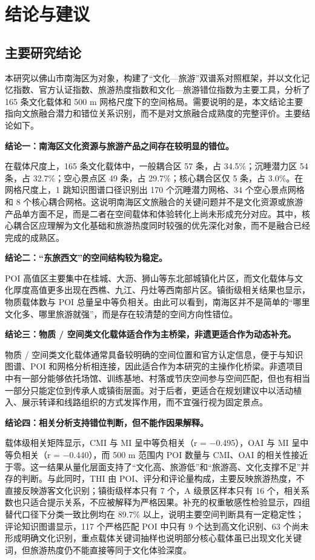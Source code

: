 \chapter{结论与建议}\label{ux7ed3ux8bbaux4e0eux5efaux8bae}

\section{主要研究结论}\label{ux4e3bux8981ux7814ux7a76ux7ed3ux8bba}

本研究以佛山市南海区为对象，构建了``文化---旅游''双谱系对照框架，并以文化记忆指数、官方认证指数、旅游热度指数和文化---旅游错位指数为主要工具，分析了 165 条文化载体和 500 m 网格尺度下的空间格局。需要说明的是，本文结论主要指向文旅融合潜力和错位关系识别，而不是对文旅融合成熟度的完整评价。主要结论如下。

\textbf{结论一：南海区文化资源与旅游产品之间存在较明显的错位。}

在载体尺度上，165 条文化载体中，一般耦合区 57 条，占 34.5\%；沉睡潜力区 54 条，占 32.7\%；空心景点区 49 条，占 29.7\%；核心耦合区仅 5 条，占 3.0\%。在网格尺度上，1 跳知识图谱口径识别出 170 个沉睡潜力网格、34 个空心景点网格和 8 个核心耦合网格。这说明南海区文旅融合的关键问题并不是文化资源或旅游产品单方面不足，而是二者在空间载体和体验转化上尚未形成充分对应。其中，核心耦合区应理解为文化基础和旅游热度同时较强的优先深化对象，而不是融合已经完成的成熟区。

\textbf{结论二：``东旅西文''的空间结构较为稳定。}

POI 高值区主要集中在桂城、大沥、狮山等东北部城镇化片区，而文化载体与文化厚度高值更多出现在西樵、九江、丹灶等西南部片区。镇街级相关结果也显示，物质载体数与 POI 总量呈中等负相关。由此可以看到，南海区并不是简单的``哪里文化多、哪里旅游就强''，而是存在较清楚的空间方向性错位。

\textbf{结论三：物质 / 空间类文化载体适合作为主桥梁，非遗更适合作为动态补充。}

物质 / 空间类文化载体通常具备较明确的空间位置和官方认定信息，便于与知识图谱、POI 和网格分析相连接，因此适合作为本研究的主操作化桥梁。非遗项目中有一部分能够依托场馆、训练基地、村落或节庆空间参与空间匹配，但也有相当一部分只能定位到传承人或镇街层面。对于后者，更适合在规划建议中以活动植入、展示转译和线路组织的方式发挥作用，而不宜强行视为固定景点。

\textbf{结论四：相关分析支持错位判断，但不能作因果解释。}

载体级相关矩阵显示，CMI 与 MI 呈中等负相关（r = −0.495），OAI 与 MI 呈中等负相关（r = −0.440），而 500 m 范围内 POI 数量与 CMI、OAI 的相关性接近于零。这一结果从量化层面支持了``文化高、旅游低''和``旅游高、文化支撑不足''并存的判断。与此同时，THI 由 POI、评分和评论量构成，主要反映旅游热度，不直接反映游客文化识别；镇街级样本只有 7 个，A 级景区样本只有 16 个，相关系数也只适合提示关系，不应被解释为严格因果。补充的权重敏感性检验显示，四组替代口径下分类一致比例均在 89.7\% 以上，说明主要空间判断具有一定稳定性；评论知识图谱显示，117 个严格匹配 POI 中只有 9 个达到高文化识别、63 个尚未形成明确文化识别，重点载体关键词抽样也说明部分核心载体虽已出现文化关键词，但旅游热度仍不能直接等同于文化体验深度。

